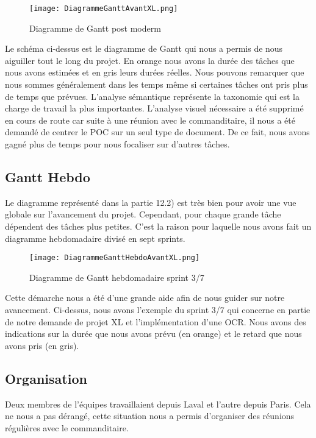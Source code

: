 \begin{figure}[h!]
  \centering
  \texttt{[image: DiagrammeGanttAvantXL.png]}
	\caption[]{Diagramme de Gantt post moderm}
	\label{}
\end{figure}

Le schéma ci-dessus est le diagramme de Gantt qui nous a permis de nous aiguiller tout le long du projet. En orange nous avons la durée des tâches que nous avons estimées et en gris leurs durées réelles.
Nous pouvons remarquer que nous sommes généralement dans les temps même si certaines tâches ont pris plus de temps que prévues. L’analyse sémantique représente la taxonomie qui est la charge de travail la plus importantes. 
L’analyse visuel nécessaire a été supprimé en cours de route car suite à une réunion avec le commanditaire, il nous a été demandé de centrer le POC sur un seul type de document. De ce fait, nous avons gagné plus de temps pour nous focaliser sur d’autres tâches. 



\subsection{Gantt Hebdo}
Le diagramme représenté dans la partie 12.2) est très bien pour avoir une vue globale sur l’avancement du projet. Cependant, pour chaque grande tâche dépendent des tâches plus petites. 
C’est la raison pour laquelle nous avons fait un diagramme hebdomadaire divisé en sept sprints. 

\begin{figure}[h!]
  \centering
  \texttt{[image: DiagrammeGanttHebdoAvantXL.png]}
	\caption[]{Diagramme de Gantt hebdomadaire sprint 3/7}
	\label{}
\end{figure}

Cette démarche nous a été d’une grande aide afin de nous guider sur notre avancement. Ci-dessus, nous avons l’exemple du sprint 3/7 qui concerne en partie de notre demande de projet XL et l’implémentation d’une OCR. 
Nous avons des indications sur la durée que nous avons prévu (en orange) et le retard que nous avons pris (en gris). 



\subsection{Organisation}
Deux membres de l’équipes travaillaient depuis Laval et l'autre depuis Paris. Cela ne nous a pas dérangé, cette situation nous a permis d’organiser des réunions régulières avec le commanditaire. 

